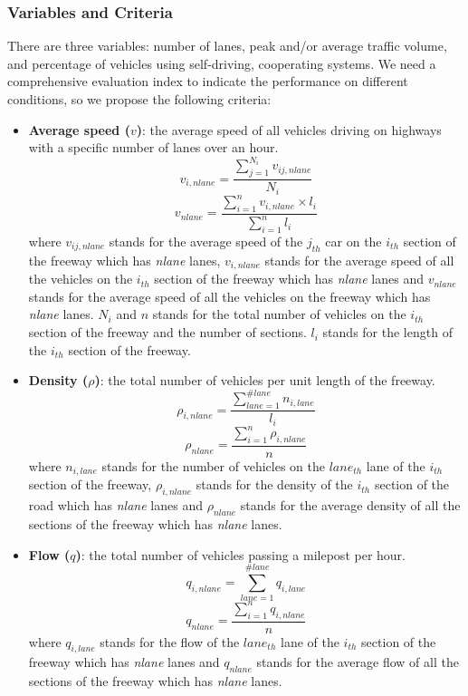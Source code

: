\documentclass[a4paper]{article}
\begin{document}
	\subsubsection{Variables and Criteria}
There are three variables: number of lanes, peak and/or average traffic volume, and percentage of vehicles using self-driving, cooperating systems. We need a comprehensive evaluation index to indicate the performance on different conditions, so we propose the following criteria:
\begin{itemize}
\item \textbf{Average speed ($v$)}: the average speed of all vehicles driving on highways with a specific number of lanes over an hour.
	$$v_{i,nlane}=\dfrac{\sum\limits_{j=1}^{N_i}v_{ij,nlane}}{{N_i}}$$
	$$v_{nlane}=\dfrac{\sum\limits_{i=1}^nv_{i,nlane}\times l_i}{\sum\limits_{i=1}^nl_i}$$
	where $v_{ij,nlane}$ stands for the average speed of the $j_{th}$ car on the $i_{th}$ section of the freeway which has \textit{nlane} lanes, $v_{i,nlane}$ stands for the average speed of all the vehicles on the $i_{th}$ section of the freeway which has \textit{nlane} lanes and $v_{nlane}$ stands for the average speed of all the vehicles on the freeway which has \textit{nlane} lanes. ${N_i}$ and $n$ stands for the total number of vehicles on the $i_{th}$ section of the freeway and the number of sections. $l_i$ stands for the length of the $i_{th}$ section of the freeway.

\item \textbf{Density ($\rho$)}: the total number of vehicles per unit length of the freeway.
$$\rho_{i,nlane}=\dfrac{\sum\limits_{lane=1}^{\#lane}n_{i,lane}}{l_i}$$
$$\rho_{nlane}=\dfrac{\sum\limits_{i=1}^{n}\rho_{i,nlane}}{n}$$
where $n_{i,lane}$ stands for the number of vehicles on the $lane_{th}$ lane of the $i_{th}$ section of the freeway, $\rho_{i,nlane}$ stands for the density of the $i_{th}$ section of the road which has \textit{nlane} lanes and $\rho_{nlane}$ stands for the average density of all the sections of the freeway which has \textit{nlane} lanes.

\item \textbf{Flow ($q$)}: the total number of vehicles passing a milepost per hour.
$$q_{i,nlane}=\sum\limits_{lane=1}^{\#lane}q_{i,lane}$$
$$q_{nlane}=\dfrac{\sum\limits_{i=1}^{n}q_{i,nlane}}{n}$$
where $q_{i,lane}$ stands for the flow of the $lane_{th}$ lane of the $i_{th}$ section of the freeway which has \textit{nlane} lanes and $q_{nlane}$ stands for the average flow of all the sections of the freeway which has \textit{nlane} lanes.
\end{itemize}
\end{document}
